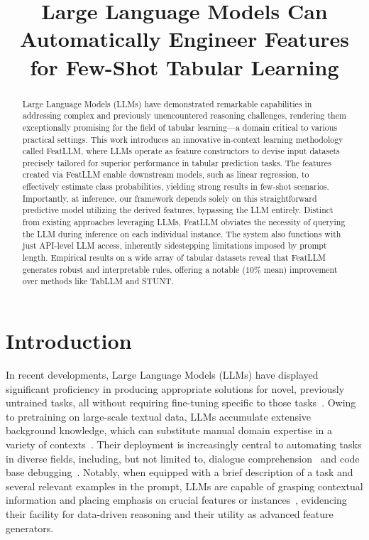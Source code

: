 \title{Large Language Models Can Automatically Engineer Features for Few-Shot Tabular Learning}

\begin{abstract}
Large Language Models (LLMs) have demonstrated remarkable capabilities in addressing complex and previously unencountered reasoning challenges, rendering them exceptionally promising for the field of tabular learning—a domain critical to various practical settings. This work introduces an innovative in-context learning methodology called \textsf{FeatLLM}, where LLMs operate as feature constructors to devise input datasets precisely tailored for superior performance in tabular prediction tasks. The features created via \textsf{FeatLLM} enable downstream models, such as linear regression, to effectively estimate class probabilities, yielding strong results in few-shot scenarios. Importantly, at inference, our framework depends solely on this straightforward predictive model utilizing the derived features, bypassing the LLM entirely. Distinct from existing approaches leveraging LLMs, \textsf{FeatLLM} obviates the necessity of querying the LLM during inference on each individual instance. The system also functions with just API-level LLM access, inherently sidestepping limitations imposed by prompt length. Empirical results on a wide array of tabular datasets reveal that \textsf{FeatLLM} generates robust and interpretable rules, offering a notable ($10\%$ mean) improvement over methods like TabLLM and STUNT.
\end{abstract}

\section{Introduction}
In recent developments, Large Language Models (LLMs) have displayed significant proficiency in producing appropriate solutions for novel, previously untrained tasks, all without requiring fine-tuning specific to those tasks~\cite{creswell2022selection,imani2023mathprompter,taylor2022galactica}. Owing to pretraining on large-scale textual data, LLMs accumulate extensive background knowledge, which can substitute manual domain expertise in a variety of contexts~\cite{Genomes2021,singhal2023large,wilcox2003role}. Their deployment is increasingly central to automating tasks in diverse fields, including, but not limited to, dialogue comprehension~\cite{finch2023leveraging} and code base debugging~\cite{fan2023automated}. Notably, when equipped with a brief description of a task and several relevant examples in the prompt, LLMs are capable of grasping contextual information and placing emphasis on crucial features or instances~\cite{brown2020language,zhao2023survey}, evidencing their facility for data-driven reasoning and their utility as advanced feature generators.

